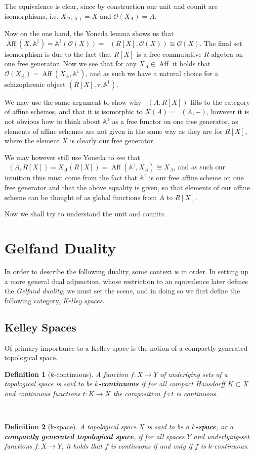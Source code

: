 \documentclass[12pt,a4paper]{article}
\newtheorem{definition}{Definition}[section] %
\DeclareMathOperator{\CAlg}{CAlg_R}
\DeclareMathOperator{\Aff}{Aff}
\begin{document}
The equivalence is clear, since by construction  our unit and counit are  isomorphisms, i.e. $X_{\mathcal{O}(X)} =X$ and $\mathcal{O}(X_A) = A$. 


Now on the one hand,  the Yoneda lemma shows us that   $\Aff(X, \mathbb{A}^1) = \mathbb{A}^1(\mathcal{O}(X)) = \CAlg(R[X], \mathcal{O}(X)) \cong \mathcal{O}(X)$. The final set isomorphism is due to the fact that $R[X]$ is a free commutative $R$-algebra on one free generator. Now we see that for any $X_A \in \Aff$ it holds that $\mathcal{O}(X_A) = \Aff(X_A, \mathbb{A}^1)$, and as such we have a natural choice for a schizophrenic object $(R[X], \tau, \mathbb{A}^1 )$. 


We may use the same argument to show why $\CAlg(A, R[X])$ lifts to the category of affine schemes, and that it is isomorphic to $X(A) = \CAlg(A, -)$, however it is not obvious how to think about $\mathbb{A}^1$ as a free functor on one free generator, as elements of affine schemes are not given in the same way as they are for $R[X]$, where the element $X$ is clearly our free generator. 

We may however still use Yoneda to see that $\CAlg(A, R[X]) = X_A(R[X]) = \Aff(\mathbb{A}^1, X_A) \cong X_A$, and as such our intuition thus must come from the fact that $\mathbb{A}^1$ is our free affine scheme on one free generator and that the above equality is given, so that elements of our affine scheme can be thought of as global functions from $A$ to $R[X]$. 

Now we shall try to understand the unit and counits.

\section{Gelfand Duality}
In order to describe the following duality, some context is in order. In setting up a more general dual adjunction, whose restriction to an equivalence later defines the \emph{Gelfand duality}, we must set the scene, and in doing so we first define the following category, \emph{Kelley spaces}.
\subsection{Kelley Spaces}
Of primary importance to a Kelley space is the notion of a compactly generated topological space.
\\
\begin{definition}[$k$-continuous]
	A function $f: X \to Y$ of underlying sets of a topological space is said to be \textbf{$k$-continuous} if for all compact Hausdorff $K \subset X$ and continuous functions $t: K \to X$ the composition $f \circ t$ is continuous. 
\end{definition}
\
\begin{definition}[k-space]
A topological space $X$ is said to be a \textbf{$k$-space}, or a \textbf{compactly generated topological space}, if for all spaces $Y$ and underlying-set functions $f: X \to Y$, it holds that $f$ is continuous if and only if $f$ is $k$-continuous.	
\end{definition}
\
\end{document}
